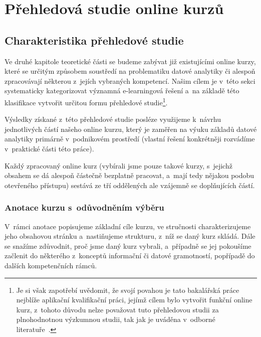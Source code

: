 \hypertarget{pux159ehledovuxe1-studie-online-kurzux16f}{%
\chapter{Přehledová studie online kurzů}\label{pux159ehledovuxe1-studie-online-kurzux16f}}

\hypertarget{charakteristika-pux159ehledovuxe9-studie}{%
\section{Charakteristika přehledové studie}\label{charakteristika-pux159ehledovuxe9-studie}}

Ve druhé kapitole teoretické části se budeme zabývat již existujícími online kurzy, které se určitým způsobem soustředí na problematiku datové analytiky či alespoň zpracovávají některou z~jejích vybraných kompetencí. Našim cílem je v~této sekci systematicky kategorizovat významná e-learningová řešení a~na základě této klasifikace vytvořit určitou formu přehledové studie\footnote{Je si však zapotřebí uvědomit, že svojí povahou je tato bakalářská práce nejblíže aplikační kvalifikační práci, jejímž cílem bylo vytvořit funkční online kurz, z~tohoto důvodu nelze považovat tuto přehledovou studii za plnohodnotnou výzkumnou studii, tak jak je uváděna v~odborné literatuře~\parencite{mares2013}.}.

Výsledky získané z~této přehledové studie posléze využijeme k~návrhu jednotlivých částí našeho online kurzu, který je zaměřen na výuku základů datové analytiky primárně v~podnikovém prostředí (vlastní řešení konkrétněji rozvádíme v~praktické části této práce).

Každý zpracovaný online kurz (vybírali jsme pouze takové kurzy, s~jejichž obsahem se dá alespoň částečně bezplatně pracovat, a~mají tedy nějakou podobu otevřeného přístupu) sestává ze tří oddělených ale vzájemně se doplňujících částí.

\hypertarget{anotace-kurzu-s-odux16fvodnux11bnuxedm-vuxfdbux11bru}{%
\subsection{Anotace kurzu s~odůvodněním výběru}\label{anotace-kurzu-s-odux16fvodnux11bnuxedm-vuxfdbux11bru}}

V~rámci anotace popisujeme základní cíle kurzu, ve stručnosti charakterizujeme jeho obsahovou stránku a~nastiňujeme strukturu, z~níž se daný kurz skládá. Dále se snažíme zdůvodnit, proč jsme daný kurz vybrali, a~případně se jej pokoušíme začlenit do některého z~konceptů informační či datové gramotností, popřípadě do dalších kompetenčních rámců.

